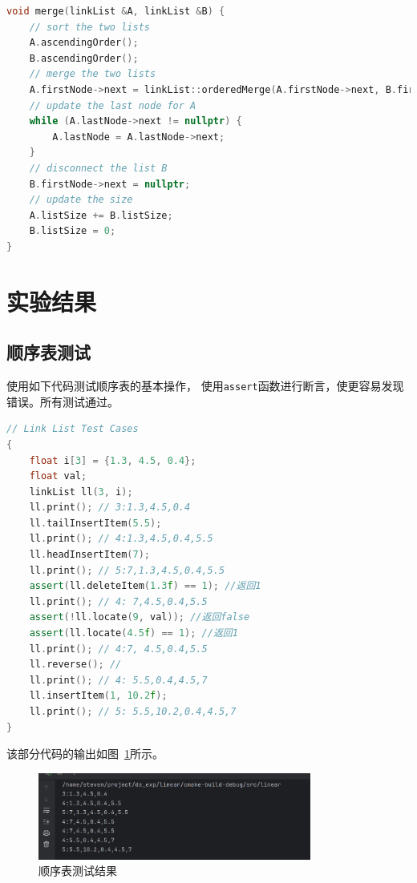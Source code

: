 \documentclass{csexp}
\begin{document}
\begin{lstlisting}[language=C++]
void merge(linkList &A, linkList &B) {
    // sort the two lists
    A.ascendingOrder();
    B.ascendingOrder();
    // merge the two lists
    A.firstNode->next = linkList::orderedMerge(A.firstNode->next, B.firstNode->next);
    // update the last node for A
    while (A.lastNode->next != nullptr) {
        A.lastNode = A.lastNode->next;
    }
    // disconnect the list B
    B.firstNode->next = nullptr;
    // update the size
    A.listSize += B.listSize;
    B.listSize = 0;
}
\end{lstlisting}


\section{实验结果}
\subsection{顺序表测试}
使用如下代码测试顺序表的基本操作， 使用\texttt{assert}函数进行断言，使更容易发现错误。所有测试通过。

\begin{lstlisting}[language=C++]
// Link List Test Cases
{
    float i[3] = {1.3, 4.5, 0.4};
    float val;
    linkList ll(3, i);
    ll.print(); // 3:1.3,4.5,0.4
    ll.tailInsertItem(5.5);
    ll.print(); // 4:1.3,4.5,0.4,5.5
    ll.headInsertItem(7);
    ll.print(); // 5:7,1.3,4.5,0.4,5.5
    assert(ll.deleteItem(1.3f) == 1); //返回1
    ll.print(); // 4: 7,4.5,0.4,5.5
    assert(!ll.locate(9, val)); //返回false
    assert(ll.locate(4.5f) == 1); //返回1
    ll.print(); // 4:7, 4.5,0.4,5.5
    ll.reverse(); //
    ll.print(); // 4: 5.5,0.4,4.5,7
    ll.insertItem(1, 10.2f);
    ll.print(); // 5: 5.5,10.2,0.4,4.5,7
}
\end{lstlisting}

该部分代码的输出如图~\ref{fig:seq-test}所示。

\begin{figure}[htbp]
    \centering
    \includegraphics[width=0.8\textwidth]{exp1-1.png}
    \caption{顺序表测试结果}
    \label{fig:seq-test}
\end{figure}
\end{document}
